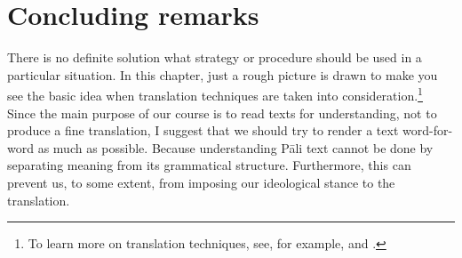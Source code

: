 \section*{Concluding remarks}

There is no definite solution what strategy or procedure should be used in a particular situation. In this chapter, just a rough picture is drawn to make you see the basic idea when translation techniques are taken into consideration.\footnote{To learn more on translation techniques, see, for example, \citealp{newmark:textbook} and \citealp{fawcett:translation}.} Since the main purpose of our course is to read texts for understanding, not to produce a fine translation, I suggest that we should try to render a text word-for-word as much as possible. Because understanding P\=ali text cannot be done by separating meaning from its grammatical structure. Furthermore, this can prevent us, to some extent, from imposing our ideological stance to the translation.

